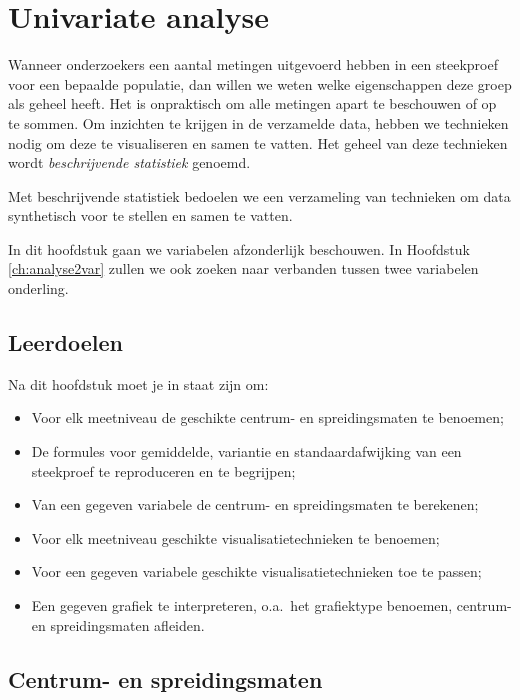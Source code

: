 \chapter{Univariate analyse}
\label{ch:analyse1var}

Wanneer onderzoekers een aantal metingen uitgevoerd hebben in een steekproef voor een bepaalde populatie, dan willen we weten welke eigenschappen deze groep als geheel heeft. Het is onpraktisch om alle metingen apart te beschouwen of op te sommen. Om inzichten te krijgen in de verzamelde data, hebben we technieken nodig om deze te visualiseren en samen te vatten. Het geheel van deze technieken wordt \emph{beschrijvende statistiek} genoemd.

\begin{definition}
  Met beschrijvende statistiek  bedoelen we een verzameling van technieken om data synthetisch voor te stellen en samen te vatten.
\end{definition}

In dit hoofdstuk gaan we variabelen afzonderlijk beschouwen. In Hoofdstuk \ref{ch:analyse2var} zullen we ook zoeken naar verbanden tussen twee variabelen onderling.

\section{Leerdoelen}
\label{sec:analyse1var-leerdoelen}

Na dit hoofdstuk moet je in staat zijn om:

\begin{itemize}
  \item Voor elk meetniveau de geschikte centrum- en spreidingsmaten te benoemen;
  \item De formules voor gemiddelde, variantie en standaardafwijking van een steekproef te reproduceren en te begrijpen;
  \item Van een gegeven variabele de centrum- en spreidingsmaten te berekenen;
  \item Voor elk meetniveau geschikte visualisatietechnieken te benoemen;
  \item Voor een gegeven variabele geschikte visualisatietechnieken toe te passen;
  \item Een gegeven grafiek te interpreteren, o.a.~het grafiektype benoemen, centrum- en spreidingsmaten afleiden.
\end{itemize}

\section{Centrum- en spreidingsmaten}

